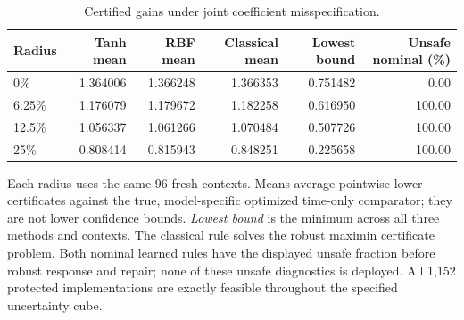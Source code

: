 \begin{table}[tbp]\centering\small
\caption{Certified gains under joint coefficient misspecification.}\label{tab:r23-robust}
\begin{tabular}{lrrrrr}\toprule
Radius & Tanh mean & RBF mean & Classical mean & Lowest bound & Unsafe nominal (\%)\\\midrule
0\% & 1.364006 & 1.366248 & 1.366353 & 0.751482 & 0.00\\
6.25\% & 1.176079 & 1.179672 & 1.182258 & 0.616950 & 100.00\\
12.5\% & 1.056337 & 1.061266 & 1.070484 & 0.507726 & 100.00\\
25\% & 0.808414 & 0.815943 & 0.848251 & 0.225658 & 100.00\\
\bottomrule\end{tabular}
\par\smallskip\begin{minipage}{.98\textwidth}\small Each radius uses the same 96 fresh contexts. Means average pointwise lower certificates against the true, model-specific optimized time-only comparator; they are not lower confidence bounds. \emph{Lowest bound} is the minimum across all three methods and contexts. The classical rule solves the robust maximin certificate problem. Both nominal learned rules have the displayed unsafe fraction before robust response and repair; none of these unsafe diagnostics is deployed. All 1,152 protected implementations are exactly feasible throughout the specified uncertainty cube.\end{minipage}
\end{table}
